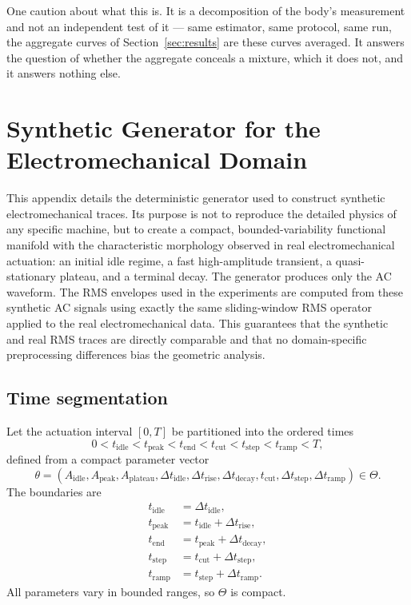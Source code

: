 \documentclass[10pt]{article}
\theoremstyle{plain}
\theoremstyle{definition}
\theoremstyle{remark}
\begin{document}
One caution about what this is. It is a decomposition of the body's
measurement and not an independent test of it --- same estimator, same
protocol, same run, the aggregate curves of Section~\ref{sec:results} are these
curves averaged. It answers the question of whether the aggregate conceals a
mixture, which it does not, and it answers nothing else.

\section{Synthetic Generator for the Electromechanical Domain}
\label{app:gen_electromechanical}

This appendix details the deterministic generator used to construct synthetic 
electromechanical traces.  
Its purpose is not to reproduce the detailed physics of any specific machine, 
but to create a compact, bounded-variability functional manifold with the 
characteristic morphology observed in real electromechanical actuation: an 
initial idle regime, a fast high-amplitude transient, a quasi-stationary 
plateau, and a terminal decay.  
The generator produces only the AC waveform.  
The RMS envelopes used in the experiments are computed from these synthetic AC 
signals using exactly the same sliding-window RMS operator applied to the 
real electromechanical data.  
This guarantees that the synthetic and real RMS traces are directly comparable 
and that no domain-specific preprocessing differences bias the geometric 
analysis.

\subsection{Time segmentation}

Let the actuation interval $[0,T]$ be partitioned into the ordered times
\[
0 < t_{\mathrm{idle}} < t_{\mathrm{peak}} < t_{\mathrm{end}} <
t_{\mathrm{cut}} < t_{\mathrm{step}} < t_{\mathrm{ramp}} < T,
\]
defined from a compact parameter vector
\[
\theta = (A_{\mathrm{idle}}, A_{\mathrm{peak}}, A_{\mathrm{plateau}}, 
          \Delta t_{\mathrm{idle}}, \Delta t_{\mathrm{rise}},
          \Delta t_{\mathrm{decay}}, t_{\mathrm{cut}},
          \Delta t_{\mathrm{step}}, \Delta t_{\mathrm{ramp}}) \in \Theta.
\]
The boundaries are
\[
\begin{aligned}
t_{\mathrm{idle}} &= \Delta t_{\mathrm{idle}}, \\
t_{\mathrm{peak}} &= t_{\mathrm{idle}} + \Delta t_{\mathrm{rise}},\\
t_{\mathrm{end}}  &= t_{\mathrm{peak}} + \Delta t_{\mathrm{decay}},\\
t_{\mathrm{step}} &= t_{\mathrm{cut}} + \Delta t_{\mathrm{step}},\\
t_{\mathrm{ramp}} &= t_{\mathrm{step}} + \Delta t_{\mathrm{ramp}}.
\end{aligned}
\]
All parameters vary in bounded ranges, so $\Theta$ is compact.
\end{document}
